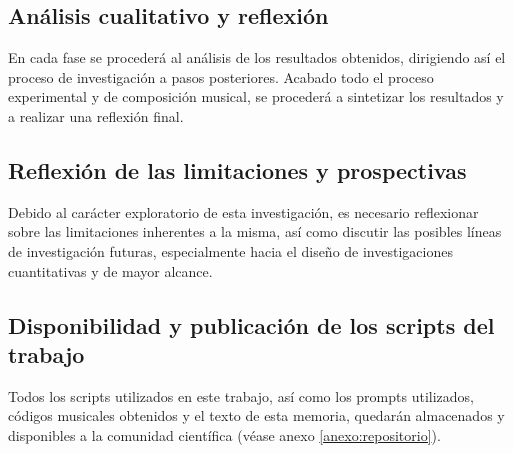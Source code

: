 \subsection{Análisis cualitativo y reflexión}
En cada fase se procederá al análisis de los resultados obtenidos, dirigiendo así el proceso de investigación a pasos posteriores. Acabado todo el proceso experimental y de composición musical, se procederá a sintetizar los resultados y a realizar una reflexión final.

\subsection{Reflexión de las limitaciones y prospectivas}
Debido al carácter exploratorio de esta investigación, es necesario reflexionar sobre las limitaciones inherentes a la misma, así como discutir las posibles líneas de investigación futuras, especialmente hacia el diseño de investigaciones cuantitativas y de mayor alcance.

\subsection{Disponibilidad y publicación de los scripts del trabajo}
Todos los scripts utilizados en este trabajo, así como los prompts utilizados, códigos musicales obtenidos y el texto de esta memoria, quedarán almacenados y disponibles a la comunidad científica (véase anexo \ref{anexo:repositorio}).